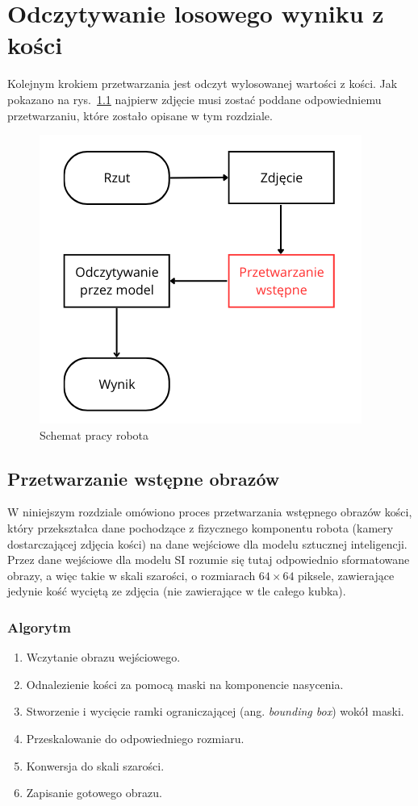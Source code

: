 \chapter{Odczytywanie losowego wyniku z kości}\label{ch:odczytywanie-losowego-wyniku-z-kosci}

Kolejnym krokiem przetwarzania jest odczyt wylosowanej wartości z kości.
Jak pokazano na rys.~\ref{fig:schemat_workflow}
najpierw zdjęcie musi zostać poddane odpowiedniemu przetwarzaniu, które zostało opisane w tym rozdziale.

\begin{figure}[H]
    \centering
    \includegraphics[width=0.5\linewidth]{chapters/04-czytanie/figures/schemat.png}
    \caption{Schemat pracy robota}
    \label{fig:schemat_workflow}
\end{figure}

\section{Przetwarzanie wstępne obrazów}\label{sec:preprocessing}

W niniejszym rozdziale omówiono proces przetwarzania wstępnego obrazów kości,
który przekształca dane pochodzące z fizycznego komponentu robota (kamery dostarczającej zdjęcia kości) na dane wejściowe dla modelu sztucznej inteligencji.
Przez dane wejściowe dla modelu SI rozumie się tutaj odpowiednio sformatowane obrazy, a więc takie w skali szarości,
o rozmiarach $64\times64$ piksele, zawierające jedynie kość wyciętą ze zdjęcia (nie zawierające w tle całego kubka).

\subsection{Algorytm}\label{subsec:algorytm}

\begin{enumerate}
    \item Wczytanie obrazu wejściowego.
    \item Odnalezienie kości za pomocą maski na komponencie nasycenia.
    \item Stworzenie i wycięcie ramki ograniczającej (ang. \textit{bounding box}) wokół maski.
    \item Przeskalowanie do odpowiedniego rozmiaru.
    \item Konwersja do skali szarości.
    \item Zapisanie gotowego obrazu.
\end{enumerate}

